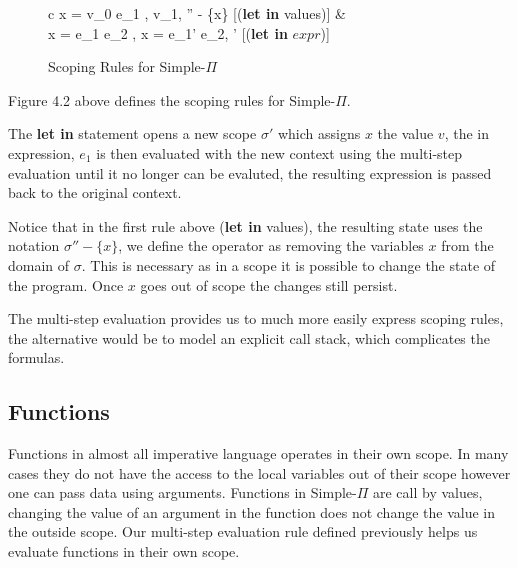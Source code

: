 \documentclass[a4paper,12pt]{report}
\begin{document}
\begin{figure}[H]
  \begin{center}
    \begin{tabular}{c}
      {\langle {}x = v_0  e_1 , \sigma \rangle 
      \longrightarrow \langle v_1, '' - \{x\} \rangle} [(\textbf{let in} values)] 
      & \\
      {\langle {}x = e_1  e_2 , \sigma \rangle 
      \longrightarrow \langle {}x = e_1'  e_2, \sigma' \rangle} 
      [(\textbf{let in} $expr$)]
    \end{tabular}
  \end{center}
  \caption{Scoping Rules for Simple-$\Pi$}
\end{figure}

\par
Figure 4.2 above defines the scoping rules for Simple-$\Pi$.

\par
The \textbf{let in} statement opens a new scope $\sigma'$ which 
assigns $x$ the value $v$, the in expression, $e_1$ is then evaluated with the 
new context using the multi-step evaluation until it no longer can be evaluted, 
the resulting expression is passed back to the original context.

\par 
Notice that in the first rule above (\textbf{let in } values), the resulting state 
uses the notation $\sigma'' - \{x\}$, we define the operator as removing the 
variables $x$ from the domain of $\sigma$. This is necessary as in a scope it is 
possible to change the state of the program. Once $x$ goes out of scope the 
changes still persist. 

\par
The multi-step evaluation provides us to much more easily express scoping rules, 
the alternative would be to model an explicit call stack, which complicates the 
formulas.

\subsection{Functions}
Functions in almost all imperative language operates in their own scope. In many 
cases they do not have the access to the local variables out of their scope however 
one can pass data using arguments. Functions in Simple-$\Pi$ are call by values, 
changing the value of an argument in the function does not change the value in 
the outside scope. Our multi-step evaluation rule defined previously helps us 
evaluate functions in their own scope. 
\end{document}
